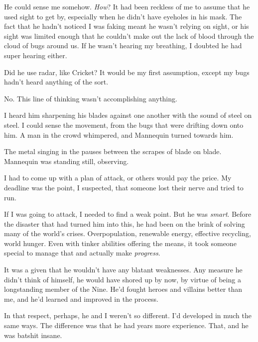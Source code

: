 He could sense me somehow.  \emph{How}?  It had been reckless of me to assume that he used sight to get by, especially when he didn't have eyeholes in his mask.  The fact that he hadn't noticed I was faking meant he wasn't relying on sight, or his sight was limited enough that he couldn't make out the lack of blood through the cloud of bugs around us.  If he wasn't hearing my breathing, I doubted he had super hearing either.



Did he use radar, like Cricket?  It would be my first assumption, except my bugs hadn't heard anything of the sort.



No.  This line of thinking wasn't accomplishing anything.



I heard him sharpening his blades against one another with the sound of steel on steel.  I could sense the movement, from the bugs that were drifting down onto him.  A man in the crowd whimpered, and Mannequin turned towards him.



The metal singing in the pauses between the scrapes of blade on blade.  Mannequin was standing still, observing.



I had to come up with a plan of attack, or others would pay the price.  My deadline was the point, I suspected, that someone lost their nerve and tried to run.



If I was going to attack, I needed to find a weak point.  But he was \emph{smart}.  Before the disaster that had turned him into this, he had been on the brink of solving many of the world's crises.  Overpopulation, renewable energy, effective recycling, world hunger.  Even with tinker abilities offering the means, it took someone special to manage that and actually make\emph{ progress}.



It was a given that he wouldn't have any blatant weaknesses.  Any measure he didn't think of himself, he would have shored up by now, by virtue of being a longstanding member of the Nine.  He'd fought heroes and villains better than me, and he'd learned and improved in the process.



In that respect, perhaps, he and I weren't so different.  I'd developed in much the same ways.  The difference was that he had years more experience.  That, and he was batshit insane.



